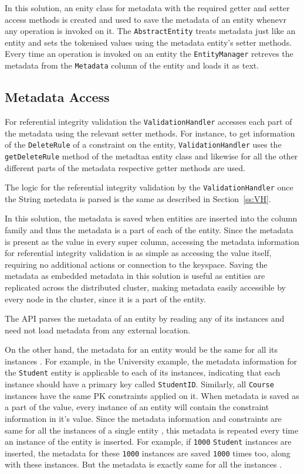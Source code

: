 	In this solution, an enity class for metadata with the required getter and
	setter access methods is created and used to save the metadata of an entity
	whenevr any operation is invoked on it.
	The \texttt{AbstractEntity} treats metadata just like an entity and sets the
	tokenised values using the metadata entity's setter methods.
	Every time an operation is invoked on an entity the \texttt{EntityManager}
	retreves the metadata from the \texttt{Metadata} column of the entity and loads
	it as text.
		 
	 
	 
\subsection{Metadata Access}
	  
 For referential integrity validation the
	 \texttt{ValidationHandler} accesses each part of the metadata using the
	 relevant setter methods. For instance, to get information of
	the \texttt{DeleteRule} of a constraint on the entity,
	\texttt{ValidationHandler} uses the \texttt{getDeleteRule} method of the
	metadtaa entity class and likewise for all the other different parts
	of the metadata respective getter methods are used.
	 
	 The logic for the referential
	 integrity validation by the \texttt{ValidationHandler} once the String metedata is parsed is the same as described in Section~\ref{ss:VH}.

	In this solution, the metadata is saved  when entities are inserted into the
	column family and thus the metadata is a part of each of the entity.  Since the
	metadata is present as the value in every super column,  accessing the metadata
	information for referential integrity validation is as simple as accessing the
	value itself,  requiring no additional actions or connection to the
	keyspace. Saving the metadata as embedded metadata in this solution is useful
	as entities are replicated across the distributed cluster, making metadata
	easily accessible by every node in the cluster, since it is a part of the
	entity.

	The \ac{API} parses the metadata of an entity by reading any of its
	instances and need not load metadata from any external location.

	On the other hand,  the metadata for an entity would be the same for all its
	instances .  For example,  in the University example,  the metadata
	information for the \texttt{Student} entity is applicable to each of its
	instances,  indicating that each instance  should have a primary key called
	\texttt{StudentID}.
	Similarly,  all \texttt{Course} instances have the same \ac{PK} constraints
	applied on it.  When metadata is saved as a part of the  value,
	every instance of an entity will contain the constraint information
	in it's value.  Since the metadata information and constraints are same for all
	the instances of a single entity ,  this metadata is repeated every time an
	instance of the entity is inserted.  For example,  if
	\texttt{1000} \texttt{Student} instances are inserted,  the metadata for these
	\texttt{1000} instances are saved \texttt{1000} times too, along with these
	instances.  But the metadata is exactly same for all the
	instances .



